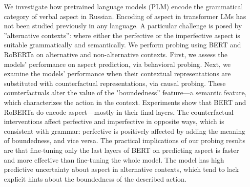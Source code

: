 We investigate how pretrained language models (PLM) encode the grammatical category of verbal aspect in Russian.  Encoding of aspect in transformer LMs has not been studied previously in any language.  A particular challenge is posed by ''alternative contexts'': where either the perfective or the imperfective aspect is suitable grammatically and semantically.  We perform probing using BERT and RoBERTa on alternative and non-alternative contexts.  First, we assess the models' performance on aspect prediction, via behavioral probing.  Next, we examine the models' performance when their contextual representations are substituted with counterfactual representations, via causal probing.  These counterfactuals alter the value of the "boundedness'' feature---a semantic feature, which characterizes the action in the context.  Experiments show that BERT and RoBERTa do encode aspect---mostly in their final layers. The counterfactual interventions affect perfective and imperfective in opposite ways, which is consistent with grammar: perfective is positively affected by adding the meaning of boundedness, and vice versa.  The practical implications of our probing results are that fine-tuning only the last layers of BERT on predicting aspect is faster and more effective than fine-tuning the whole model.  The model has high predictive uncertainty about aspect in alternative contexts, which tend to lack explicit hints about the boundedness of the described action.